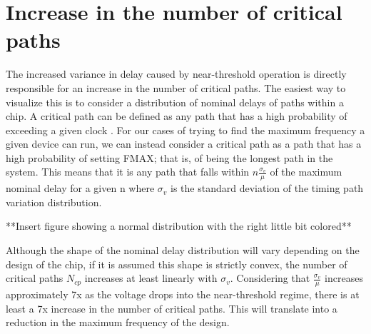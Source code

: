 \section{Increase in the number of critical paths}
 The increased variance in delay caused by near-threshold operation is directly responsible for an increase in the number of critical paths. The easiest way to visualize this is to consider a distribution of nominal delays of paths within a chip. A critical path can be defined as any path that has a high probability of exceeding a given clock \cite{Wang:2004bw}. For our cases of trying to find the maximum frequency a given device can run, we can instead consider a critical path as a path that has a high probability of setting FMAX; that is, of being the longest path in the system. This means that it is any path that falls within $n\frac{\sigma_v}{\mu}$ of the maximum nominal delay for a given n where $\sigma_v$ is the standard deviation of the timing path variation distribution.
 
 **Insert figure showing a normal distribution with the right little bit colored**
 
 Although the shape of the nominal delay distribution will vary depending on the design of the chip, if it is assumed this shape is strictly convex, the number of critical paths $N_{cp}$ increases at least linearly with $\sigma_v$. Considering that $\frac{\sigma_v}{\mu}$ increases approximately 7x as the voltage drops into the near-threshold regime, there is at least a 7x increase in the number of critical paths. This will translate into a reduction in the maximum frequency of the design\cite{Bowman:2002cp}. 

